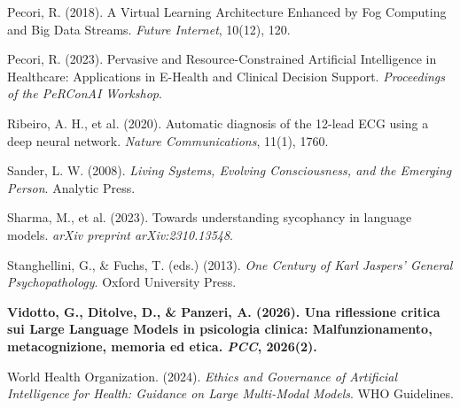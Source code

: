 \documentclass[11pt,a4paper]{article}
\begin{document}
\begin{enumerate}[label={[\arabic*]}]
    \item Pecori, R. (2018). A Virtual Learning Architecture Enhanced by Fog Computing and Big Data Streams. \textit{Future Internet}, 10(12), 120.
    \item Pecori, R. (2023). Pervasive and Resource-Constrained Artificial Intelligence in Healthcare: Applications in E-Health and Clinical Decision Support. \textit{Proceedings of the PeRConAI Workshop}.
    \item Ribeiro, A. H., et al. (2020). Automatic diagnosis of the 12-lead ECG using a deep neural network. \textit{Nature Communications}, 11(1), 1760.
    \item Sander, L. W. (2008). \textit{Living Systems, Evolving Consciousness, and the Emerging Person}. Analytic Press.
    \item Sharma, M., et al. (2023). Towards understanding sycophancy in language models. \textit{arXiv preprint arXiv:2310.13548}.
    \item Stanghellini, G., \& Fuchs, T. (eds.) (2013). \textit{One Century of Karl Jaspers' General Psychopathology}. Oxford University Press.
    \item \textbf{Vidotto, G., Ditolve, D., \& Panzeri, A. (2026). Una riflessione critica sui Large Language Models in psicologia clinica: Malfunzionamento, metacognizione, memoria ed etica. \textit{PCC}, 2026(2).}
    \item World Health Organization. (2024). \textit{Ethics and Governance of Artificial Intelligence for Health: Guidance on Large Multi-Modal Models}. WHO Guidelines.
\end{enumerate}
\end{document}
